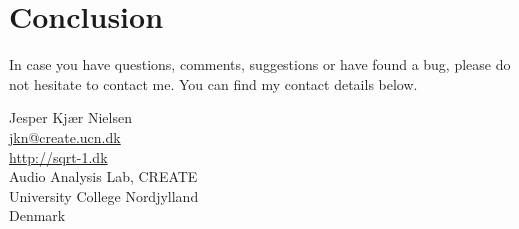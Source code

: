 \chapter{Conclusion}\label{ch:conclusion}
In case you have questions, comments, suggestions or have found a bug, please do not hesitate to contact me. You can find my contact details below.
  \begin{center}
    Jesper Kjær Nielsen\\
    \href{mailto: jkn@create.ucn.dk}{jkn@create.ucn.dk}\\
    \href{http://sqrt-1.dk}{http://sqrt-1.dk}\\
    Audio Analysis Lab, CREATE\\
    University College Nordjylland\\
    Denmark
  \end{center}

